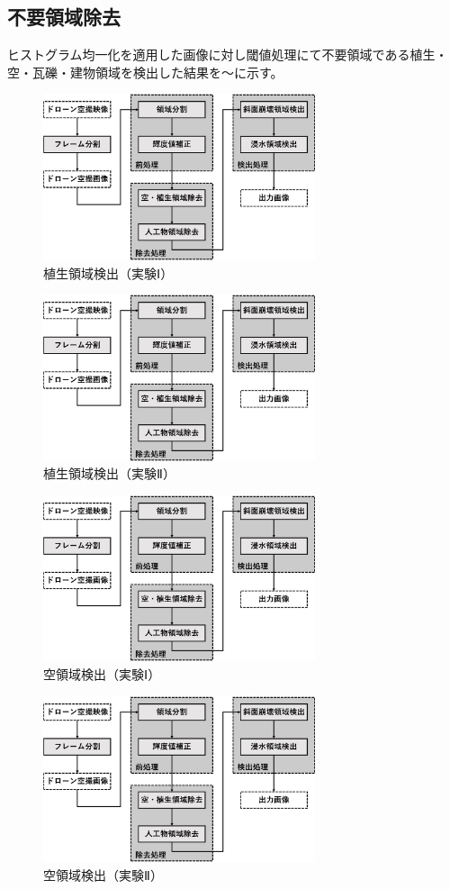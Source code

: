 \documentclass[../Thesis]{subfiles}
\begin{document}
\subsection{不要領域除去}
ヒストグラム均一化を適用した画像に対し閾値処理にて不要領域である植生・空・瓦礫・建物領域を検出した結果を～に示す。


\begin{figure}[h]
	\centering
	\includegraphics[width=8cm]{img/howto3.jpg}
	\caption{植生領域検出（実験Ⅰ）}
	\label{img05}
\end{figure}
\begin{figure}[h]
	\centering
	\includegraphics[width=8cm]{img/howto3.jpg}
	\caption{植生領域検出（実験Ⅱ）}
	\label{img06}
\end{figure}

\begin{figure}[h]
	\centering
	\includegraphics[width=8cm]{img/howto3.jpg}
	\caption{空領域検出（実験Ⅰ）}
	\label{img05}
\end{figure}
\begin{figure}[h]
	\centering
	\includegraphics[width=8cm]{img/howto3.jpg}
	\caption{空領域検出（実験Ⅱ）}
	\label{img06}
\end{figure}
\end{document}
